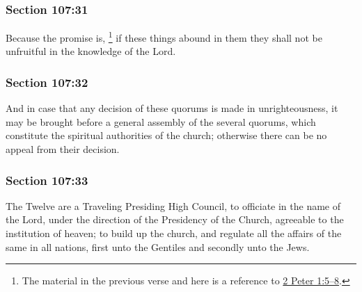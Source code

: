 	\subsubsection{Section 107:31} %
		\label{DC107-31}

		Because the promise is,
			\footnote{%
				The material in the previous verse and here is a reference to \hyperref[2PETER-1-5]{2 Peter 1:5--8}.
				}%
		if these things abound in them they shall not be unfruitful in the knowledge of the Lord.


	\subsubsection{Section 107:32} %
		\label{DC107-32}

		And in case that any decision of these quorums is made in unrighteousness, it may be brought before a general assembly of the several quorums, which constitute the spiritual authorities of the church; otherwise there can be no appeal from their decision.


	\subsubsection{Section 107:33} %
		\label{DC107-33}

		The Twelve are a Traveling Presiding High Council, to officiate in the name of the Lord, under the direction of the Presidency of the Church, agreeable to the institution of heaven; to build up the church, and regulate all the affairs of the same in all nations, first unto the Gentiles and secondly unto the Jews.

